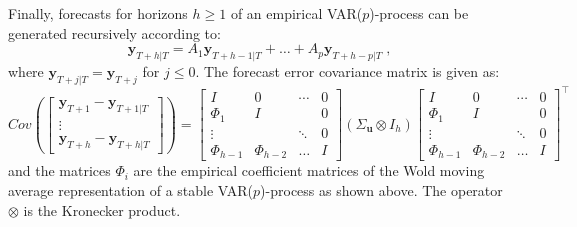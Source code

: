 \documentclass[nojss]{jss}
\begin{document}
Finally, forecasts for horizons $h \geq 1$ of an empirical
VAR($p$)-process can be generated recursively according to:  
\begin{equation}
\label{eq7}
\bm{y}_{T+h | T} = A_1 \bm{y}_{T+h-1 | T}  + \ldots + A_p
\bm{y}_{T+h-p | T} \; , 
\end{equation}
where $\bm{y}_{T+j | T} = \bm{y}_{T+j}$ for $j \leq 0$. The
forecast error covariance matrix is given as: 
\begin{equation*}
Cov \left ( 
\begin{bmatrix}
\bm{y}_{T+1} - \bm{y}_{T+1|T} \\
\vdots \\
\bm{y}_{T+h} - \bm{y}_{T+h|T} 
\end{bmatrix}
\right ) = 
\begin{bmatrix}
I          & 0          & \cdots & 0 \\
\Phi_1     & I          &        & 0 \\
\vdots     &            & \ddots & 0 \\
\Phi_{h-1} & \Phi_{h-2} & \ldots & I
\end{bmatrix}
(\Sigma_{\bm{u}} \otimes I_h)
\begin{bmatrix}
I          & 0          & \cdots & 0 \\
\Phi_1     & I          &        & 0 \\
\vdots     &            & \ddots & 0 \\
\Phi_{h-1} & \Phi_{h-2} & \ldots & I
\end{bmatrix}^\top
\end{equation*}
%
and the matrices $\Phi_i$ are the empirical coefficient matrices of
the Wold moving average representation of a stable VAR($p$)-process as
shown above. The operator $\otimes$ is the Kronecker product.
\end{document}
